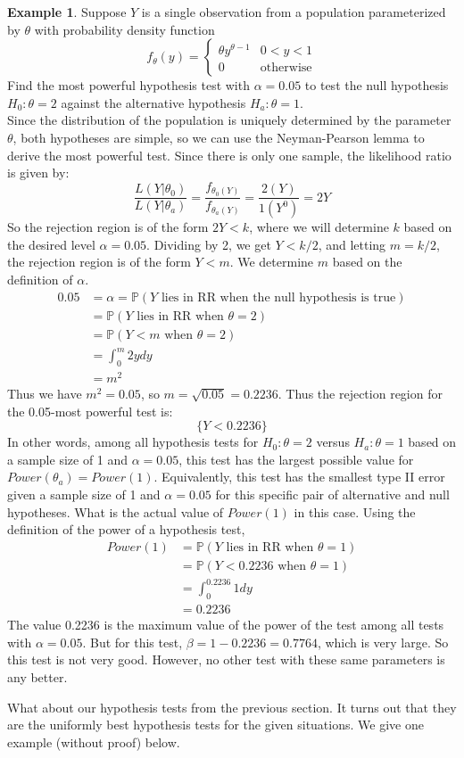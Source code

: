 \documentclass[12pt]{article}
\theoremstyle{definition}
\newtheorem*{example}{Example}
\theoremstyle{remark}
\def\P{{\mathbb P}}
\begin{document}
\begin{example}Suppose $Y$ is a single observation from a population parameterized by $\theta$ with probability density function
\[
f_\theta(y) = \begin{cases}
\theta y^{\theta - 1} & 0 < y < 1 \\
0 & \text{otherwise}
\end{cases}
\]
Find the most powerful hypothesis test with $\alpha = 0.05$ to test the null hypothesis $H_0: \theta = 2$ against the alternative hypothesis $H_a: \theta = 1$.\\

Since the distribution of the population is uniquely determined by the parameter $\theta$, both hypotheses are simple, so we can use the Neyman-Pearson lemma to derive the most powerful test. Since there is only one sample, the likelihood ratio is given by:
\[
\frac{L(Y|\theta_0)}{L(Y|\theta_a)} = \frac{f_{\theta_0(Y)}}{f_{\theta_a(Y)}} = \frac{2(Y)}{1(Y^0)} = 2Y  
\]
So the rejection region is of the form $2Y < k$, where we will determine $k$ based on the desired level $\alpha = 0.05$. Dividing by 2, we get $Y < k/2$, and letting $m = k/2$, the rejection region is of the form $Y < m$. We determine $m$ based on the definition of $\alpha$.
\begin{align*}
0.05 &= \alpha = \P(Y \text{ lies in RR when the null hypothesis is true})\\
&= \P(Y \text{ lies in RR when }\theta = 2)\\
&= \P(Y < m \text{ when }\theta = 2)\\
&= \int_0^m 2y dy\\
&= m^2
\end{align*}
Thus we have $m^2 = 0.05$, so $m = \sqrt{0.05} = 0.2236$. Thus the rejection region for the 0.05-most powerful test is:
\[
\{ Y < 0.2236 \}
\]
In other words, among all hypothesis tests for $H_0: \theta = 2$ versus $H_a: \theta = 1$ based on a sample size of 1 and $\alpha = 0.05$, this test has the largest possible value for $Power(\theta_a) = Power(1)$. Equivalently, this test has the smallest type II error given a sample size of 1 and $\alpha = 0.05$ for this specific pair of alternative and null hypotheses. What is the actual value of $Power(1)$ in this case. Using the definition of the power of a hypothesis test,
\begin{align*}
Power(1) &= \P(Y \text{ lies in RR when }\theta = 1)\\
&= \P(Y < 0.2236 \text{ when }\theta = 1)\\
&= \int_0^{0.2236} 1 dy\\
&= 0.2236
\end{align*}
The value 0.2236 is the maximum value of the power of the test among all tests with $\alpha = 0.05$. But for this test, $\beta = 1 - 0.2236 = 0.7764$, which is very large. So this test is not very good. However, no other test with these same parameters is any better.
\end{example}
What about our hypothesis tests from the previous section. It turns out that they are the uniformly best hypothesis tests for the given situations. We give one example (without proof) below.
\end{document}
